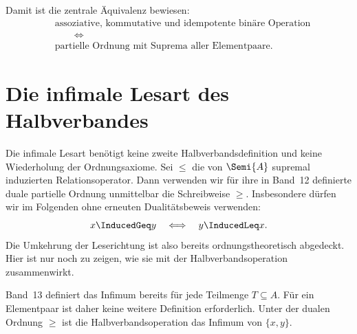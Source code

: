 \documentclass[main.tex]{subfiles}
\begin{document}
Damit ist die zentrale Äquivalenz bewiesen:
\[
  \boxed{
    \begin{aligned}
      &\text{assoziative, kommutative und idempotente binäre Operation}\\
      &\qquad\Longleftrightarrow\\
      &\text{partielle Ordnung mit Suprema aller Elementpaare.}
    \end{aligned}}
\]

\section{Die infimale Lesart des Halbverbandes}

Die infimale Lesart benötigt keine zweite Halbverbandsdefinition und keine
Wiederholung der Ordnungsaxiome. Sei \(\leq\) die von
\(\Semi{A}\) supremal induzierten Relationsoperator. Dann verwenden wir
für ihre in Band~12 definierte duale partielle Ordnung unmittelbar die
Schreibweise \(\geq\). Insbesondere dürfen wir im Folgenden ohne erneuten
Dualitätsbeweis verwenden:
\[
  x\InducedGeq y\quad\Longleftrightarrow\quad y\InducedLeq x.
\]
Die Umkehrung der Leserichtung ist also bereits ordnungstheoretisch
abgedeckt. Hier ist nur noch zu zeigen, wie sie mit der
Halbverbandsoperation zusammenwirkt.

\begin{tabproofwide}
\end{tabproofwide}

Band~13 definiert das Infimum bereits für jede Teilmenge \(T\subseteq A\).
Für ein Elementpaar ist daher keine weitere Definition erforderlich. Unter
der dualen Ordnung \(\geq\) ist die Halbverbandsoperation das Infimum von
\(\{x,y\}\).
\end{document}
